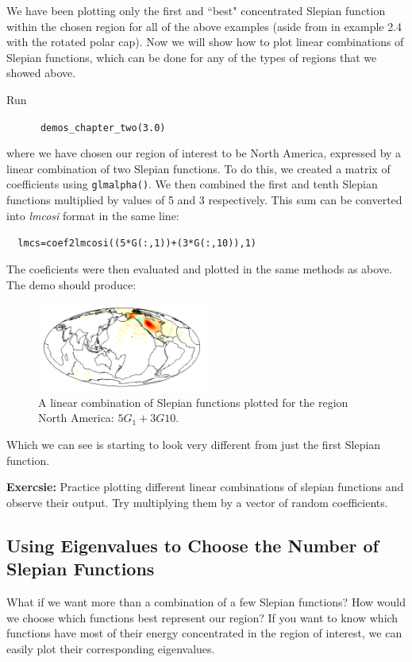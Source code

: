 \documentclass[11pt]{article}
\begin{document}
We have been plotting only the first and ``best" concentrated Slepian function within the chosen region for all of the above examples (aside from in example 2.4 with the rotated polar cap). Now we will show how to plot linear combinations of Slepian functions, which can be done for any of the types of regions that we showed above.

Run

\verb|		demos_chapter_two(3.0)|

where we have chosen our region of interest to be North America, expressed by a linear combination of two Slepian functions. To do this, we created a matrix of coefficients using \verb|glmalpha()|. We then combined the first and tenth Slepian functions multiplied by values of 5 and 3 respectively. This sum can be converted into \textit{lmcosi} format in the same line:

\verb|	lmcs=coef2lmcosi((5*G(:,1))+(3*G(:,10)),1)|

The coeficients were then evaluated and plotted in the same methods as above. The demo should produce:

\begin{figure}[H]
  \centering
  \includegraphics[width=0.5\textwidth]{figures/figure6A.png}
  \caption{A linear combination of Slepian functions plotted for the region North America: $5G_{1} + 3G{10}$.}
\label{figure6}
\end{figure}

Which we can see is starting to look very different from just the first Slepian function.

\textbf{Exercsie:} Practice plotting different linear combinations of slepian functions and observe their output. Try multiplying them by a vector of random coefficients.

\subsection{Using Eigenvalues to Choose the Number of Slepian Functions} 

What if we want more than a combination of a few Slepian functions? How would we choose which functions best represent our region? If you want to know which functions have most of their energy concentrated in the region of interest, we can easily plot their corresponding eigenvalues.
\end{document}
